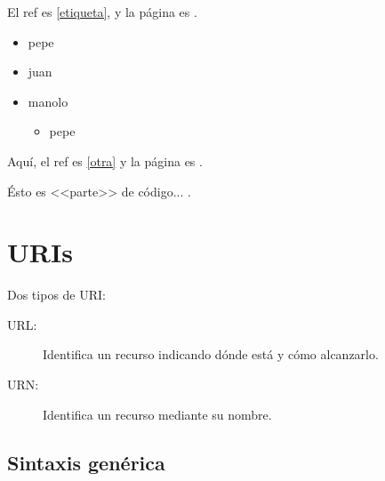 \documentclass[a4paper,11pt]{memoir}
\begin{document}

El ref es \ref{etiqueta}, y la página es \pageref{etiqueta}.



\begin{itemize}
  \item pepe
  \item juan
  \item manolo
  \begin{itemize}
    \item pepe
  \end{itemize}
\end{itemize}


Aquí, el ref es \ref{otra} y la página es \pageref{otra}.

Ésto es <<parte>> de código...  .

\section{URIs}

Dos tipos de URI:
\begin{description}
    \item [{URL:}] Identifica un recurso indicando dónde está y cómo alcanzarlo.
    \item [{URN:}] Identifica un recurso mediante su nombre.
\end{description}

\subsection{Sintaxis genérica}
\end{document}
